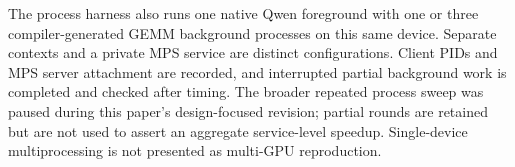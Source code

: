 The process harness also runs one native Qwen foreground with one or three
compiler-generated GEMM background processes on this same device. Separate
contexts and a private MPS service are distinct configurations. Client PIDs
and MPS server attachment are recorded, and interrupted partial background
work is completed and checked after timing. The broader repeated process
sweep was paused during this paper's design-focused revision; partial rounds
are retained but are not used to assert an aggregate service-level speedup.
Single-device multiprocessing is not presented as multi-GPU reproduction.
